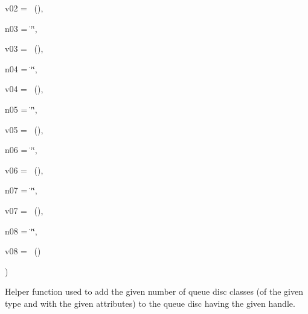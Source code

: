 {\begin{DoxyParamCaption}
\item[{const {\bf Attribute\+Value} \&}]{v02 = {~()}, }
\item[{std\+::string}]{n03 = {\ttfamily \char`\"{}\char`\"{}}, }
\item[{const {\bf Attribute\+Value} \&}]{v03 = {~()}, }
\item[{std\+::string}]{n04 = {\ttfamily \char`\"{}\char`\"{}}, }
\item[{const {\bf Attribute\+Value} \&}]{v04 = {~()}, }
\item[{std\+::string}]{n05 = {\ttfamily \char`\"{}\char`\"{}}, }
\item[{const {\bf Attribute\+Value} \&}]{v05 = {~()}, }
\item[{std\+::string}]{n06 = {\ttfamily \char`\"{}\char`\"{}}, }
\item[{const {\bf Attribute\+Value} \&}]{v06 = {~()}, }
\item[{std\+::string}]{n07 = {\ttfamily \char`\"{}\char`\"{}}, }
\item[{const {\bf Attribute\+Value} \&}]{v07 = {~()}, }
\item[{std\+::string}]{n08 = {\ttfamily \char`\"{}\char`\"{}}, }
\item[{const {\bf Attribute\+Value} \&}]{v08 = {~()}}
\end{DoxyParamCaption}
)}\hypertarget{classns3_1_1TrafficControlHelper_a069be368b76a4d89285a9db73df8f20a}{}\label{classns3_1_1TrafficControlHelper_a069be368b76a4d89285a9db73df8f20a}
Helper function used to add the given number of queue disc classes (of the given type and with the given attributes) to the queue disc having the given handle.


